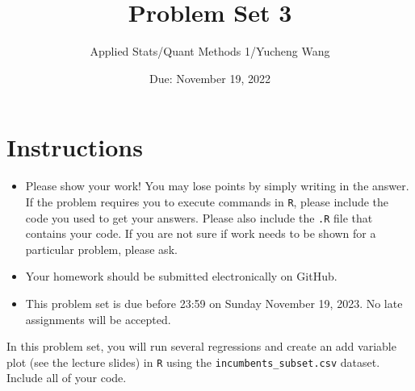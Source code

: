 \documentclass[12pt,letterpaper]{article}
\title{Problem Set 3}
\date{Due: November 19, 2022}
\author{Applied Stats/Quant Methods 1/Yucheng Wang}
\begin{document}
	\maketitle
	\section*{Instructions}
	\begin{itemize}
		\item Please show your work! You may lose points by simply writing in the answer. If the problem requires you to execute commands in \texttt{R}, please include the code you used to get your answers. Please also include the \texttt{.R} file that contains your code. If you are not sure if work needs to be shown for a particular problem, please ask.
	\item Your homework should be submitted electronically on GitHub.
	\item This problem set is due before 23:59 on Sunday November 19, 2023. No late assignments will be accepted.

	\end{itemize}

		\vspace{.25cm}
	
\noindent In this problem set, you will run several regressions and create an add variable plot (see the lecture slides) in \texttt{R} using the \texttt{incumbents\_subset.csv} dataset. Include all of your code.

	\vspace{.5cm}
\end{document}
